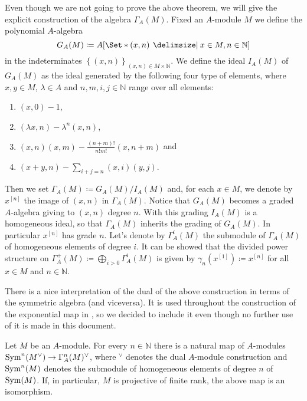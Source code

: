 \begin{rem}
	Even though we are not going to prove the above theorem,
	we will give the explicit construction of the algebra \(\Gamma_A(M)\).
	Fixed an \(A\)-module \(M\) we define the polynomial \(A\)-algebra
	\begin{equation*}
		G_A(M) \coloneqq
		A [ \Set*{\left(x, n\right) \given x \in M, n \in \mathbb{N}} ]
	\end{equation*}
	in the indeterminates 
	\(\left\{ \left(x, n\right) \right\}_{ \left(x, n\right) \in M \times \mathbb{N}}\).
	We define the ideal \(I_A(M)\) of \(G_A(M)\) as the ideal
	generated by the following four type of elements, where \(x,y \in M\), \(\lambda \in A\)
	and \(n,m,i,j \in \mathbb{N}\) range over all elements:
\begin{enumerate}
	\item \(\left(x, 0\right) - 1\),
	\item \(\left(\lambda x, n\right) - \lambda^n \left(x, n\right)\),
	\item \(\left(x, n\right) \left(x, m\right) -
		\frac{ \left( n+m \right)! }{ n!m! } \left(x, n+m\right)\)
	and
	\item \(\left(x+y, n\right) - \sum_{ i+j = n }^{  } \left(x, i\right) \left(y, j\right)\).
\end{enumerate}
	Then we set \(\Gamma_A(M) \coloneqq G_A(M) / I_A(M)\)
	and, for each \(x \in M\), we denote by \(x^{[n]}\)
	the image of \((x,n)\) in \(\Gamma_A(M)\).
	Notice that \(G_A(M)\) becomes a graded \(A\)-algebra
	giving to \((x,n)\) degree \(n\).
	With this grading \(I_A(M)\) is a homogeneous ideal, so that
	\(\Gamma_A(M)\) inherits the grading of \(G_A(M)\).
	In particular \(x^{[n]}\) has grade \(n\).
	Let's denote by \(\Gamma_A^i(M)\) the submodule of
	\(\Gamma_A(M)\) of homogeneous elements of degree \(i\).
	It can be showed that the divided power structure
	on \(\Gamma^+_A(M) \coloneqq \bigoplus_{ i > 0 } \Gamma^i_A(M)\) is 
	given by \(\gamma_n(x^{[1]}) \coloneqq x^{[n]}\)
	for all \(x \in M\) and \(n \in \mathbb{N}\).
\end{rem}


\noindent
There is a nice interpretation of the dual of the above construction in terms
of the symmetric algebra (and viceversa).
It is used throughout the construction of the exponential map in \cite{Messing},
so we decided to include it even though no further use of it is made in this document.
\begin{prop}
	Let \(M\) be an \(A\)-module.
	For every \(n \in \mathbb{N}\) there is a natural map of \(A\)-modules
	\(\operatorname{Sym}^n(M^\vee) \to  \Gamma^n_A(M)^\vee\),
	where \({ }^\vee\) denotes the dual \(A\)-module
	construction and \(\operatorname{Sym}^n(M)\) denotes the submodule of homogeneous elements
	of degree \(n\) of \(\operatorname{Sym}(M)\).
	If, in particular, \(M\) is projective of finite rank,
	the above map is an isomorphism.
\end{prop}


